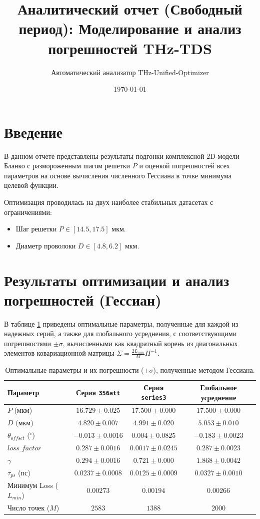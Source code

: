\documentclass[12pt,a4paper]{article}
\title{Аналитический отчет (Свободный период): Моделирование и анализ погрешностей THz-TDS}
\author{Автоматический анализатор THz-Unified-Optimizer}
\date{\today}
\begin{document}
\maketitle

\tableofcontents
\newpage

\section{Введение}
В данном отчете представлены результаты подгонки комплексной 2D-модели Бланко с размороженным шагом решетки $P$ и оценкой погрешностей всех параметров на основе вычисления численного Гессиана в точке минимума целевой функции.

Оптимизация проводилась на двух наиболее стабильных датасетах с ограничениями:
\begin{itemize}
    \item Шаг решетки $P \in [14.5, 17.5]$ мкм.
    \item Диаметр проволоки $D \in [4.8, 6.2]$ мкм.
\end{itemize}

\section{Результаты оптимизации и анализ погрешностей (Гессиан)}
В таблице \ref{tab:params} приведены оптимальные параметры, полученные для каждой из надежных серий, а также для глобального усреднения, с соответствующими погрешностями $\pm \sigma$, вычисленными как квадратный корень из диагональных элементов ковариационной матрицы $\Sigma = \frac{2 L_{min}}{M} H^{-1}$.

\begin{table}[H]
\centering
\caption{Оптимальные параметры и их погрешности ($\pm \sigma$), полученные методом Гессиана.}
\label{tab:params}
\begin{tabular}{lccc}
\toprule
Параметр & Серия \texttt{356att} & Серия \texttt{series3} & Глобальное усреднение \\
\midrule
$P$ (мкм)           & $16.729 \pm 0.025$ & $17.500 \pm 0.000$ & $17.500 \pm 0.000$ \\
$D$ (мкм)           & $4.820 \pm 0.007$ & $4.991 \pm 0.020$ & $5.053 \pm 0.010$ \\
$\theta_{offset}$ ($^\circ$) & $-0.013 \pm 0.0016$ & $0.004 \pm 0.0825$ & $-0.183 \pm 0.0023$ \\
$loss\_factor$      & $0.287 \pm 0.0016$ & $0.0017 \pm 0.0245$ & $0.287 \pm 0.0023$ \\
$\gamma$            & $0.294 \pm 0.0016$ & $0.721 \pm 0.000$ & $1.868 \pm 0.0042$ \\
$\tau_{ps}$ (пс)    & $0.0237 \pm 0.0008$ & $0.0125 \pm 0.0009$ & $0.0327 \pm 0.0010$ \\
\midrule
Минимум Loss ($L_{min}$) & $0.00273$ & $0.00194$ & $0.00266$ \\
Число точек ($M$)    & $2583$ & $1388$ & $2000$ \\
\bottomrule
\end{tabular}
\end{table}
\end{document}
